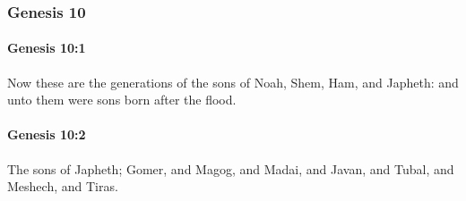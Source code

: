 	\subsubsection{Genesis 10} %
		\label{GENESIS-10}

		\paragraph{Genesis 10:1} %
			\label{GENESIS-10-1}

			Now these are the generations of the sons of Noah, Shem, Ham, and Japheth: and unto them were sons born after the flood.


		\paragraph{Genesis 10:2} %
			\label{GENESIS-10-2}

			The sons of Japheth; Gomer, and Magog, and Madai, and Javan, and Tubal, and Meshech, and Tiras.


